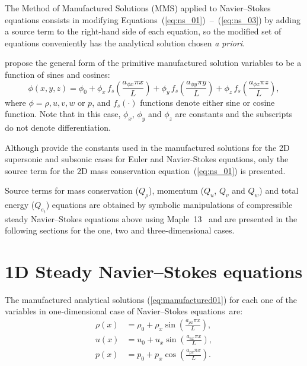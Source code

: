 \documentclass[10pt]{article}
\begin{document}
The Method of Manufactured Solutions (MMS) applied to Navier--Stokes equations consists in modifying Equations~(\ref{eq:ns_01})~--~(\ref{eq:ns_03}) by adding a source term to the right-hand side of each equation, so the modified set of equations conveniently has the analytical solution chosen \textit{a priori}.

\citet{Roy2002} propose the general form of the primitive manufactured solution variables to be  a function of sines and cosines:
\begin{equation}
 \label{eq:manufactured01}
  \phi (x,y,z) = \phi_0+ \phi_x\, f_s \left(\frac{a_{\phi x} \pi x}{L} \right) +  \phi_y \,f_s\left(\frac{a_{\phi y} \pi y}{L}\right) + \phi_z \,f_s\left(\frac{a_{\phi z} \pi z}{L}\right),
\end{equation}
where $\phi=\rho,u,v,w$ or $p$, and $f_s(\cdot)$ functions denote either sine or cosine function. Note that in this case, $\phi_x$, $\phi_y$  and $\phi_z$ are constants  and the subscripts do not denote differentiation.



Although \citet{Roy2002} provide the constants used in the manufactured solutions for the 2D supersonic and subsonic cases for Euler and Navier-Stokes equations, only the source term for the 2D mass conservation equation~(\ref{eq:ns_01}) is presented.


Source terms  for mass conservation ($Q_\rho$), momentum ($Q_u$, $Q_v$ and $Q_w$)  and total energy ($Q_{e_t}$) equations are obtained by symbolic manipulations of compressible steady Navier--Stokes equations above using Maple~13~\citep{Maple} and are presented in the following sections for the one, two and three-dimensional cases.


\section{1D Steady Navier--Stokes equations}

The manufactured analytical solutions (\ref{eq:manufactured01}) for each one of the variables in one-dimensional case of Navier--Stokes equations~are:
\begin{equation}
\begin{split}
\label{eq:manufactured_1d}
\rho\left(x\right) &=  \rho_{0}+ \rho_{x} \sin\left(\frac{a_{ \rho x} \pi x}{L}\right),\\
u\left(x\right) &= u_{0}+u_{x} \sin\left(\frac{a_{u x} \pi x}{L}\right),\\
p\left(x\right) &= p_{0}+p_{x} \cos\left(\frac{a_{p x} \pi x}{L}\right).\\
\end{split}
\end{equation}
\end{document}
